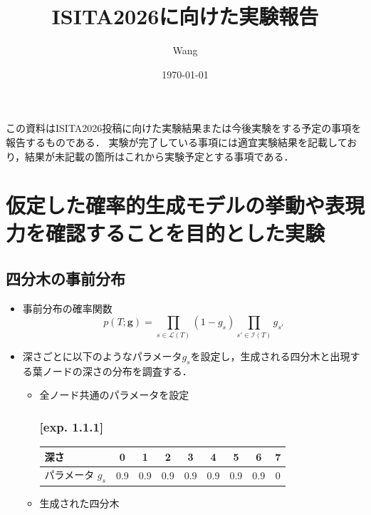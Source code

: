 \documentclass[pdftex,11pt,a4paper]{jlreq} %
\title{ISITA2026に向けた実験報告}
\author{Wang}
\date{\today}
\begin{document}
\maketitle


この資料はISITA2026投稿に向けた実験結果または今後実験をする予定の事項を報告するものである．
実験が完了している事項には適宜実験結果を記載しており，結果が未記載の箇所はこれから実験予定とする事項である．

\section{仮定した確率的生成モデルの挙動や表現力を確認することを目的とした実験}

\subsection{四分木の事前分布}
\begin{itemize}
    \item 事前分布の確率関数
    \begin{equation}
        p(T;\mathbf{g})=\prod_{s\in \mathcal{L}(T)}(1-g_s)\prod_{s'\in \mathcal{I}(T)}g_{s'}
    \end{equation}

    \item 深さごとに以下のようなパラメータ$g_s$を設定し，生成される四分木と出現する葉ノードの深さの分布を調査する．
    \begin{itemize}
        \item 全ノード共通のパラメータを設定
        
        \subsubsection*{[exp. 1.1.1]}
        
        \begin{table}[h]
            \centering
            \begin{tabular}{lcccccccc}
                \toprule
                深さ & 0 & 1 & 2 & 3 & 4 & 5 & 6 & 7 \\
                \midrule
                パラメータ $g_s$ & 0.9 & 0.9 & 0.9 & 0.9 & 0.9 & 0.9 & 0.9 & 0 \\
                \bottomrule
            \end{tabular}
        \end{table}
        
        \item 生成された四分木
    \end{itemize}
\end{itemize}
\end{document}
